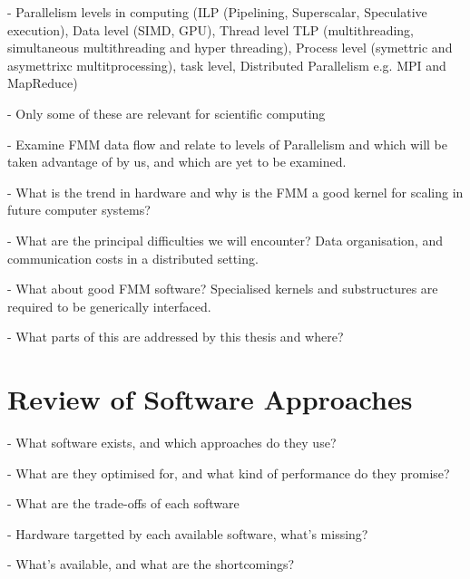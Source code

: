 - Parallelism levels in computing (ILP (Pipelining, Superscalar, Speculative execution), Data level (SIMD, GPU), Thread level TLP (multithreading, simultaneous multithreading and hyper threading), Process level (symettric and asymettrixc multitprocessing), task level, Distributed Parallelism e.g. MPI and MapReduce)

- Only some of these are relevant for scientific computing

- Examine FMM data flow and relate to levels of Parallelism and which will be taken advantage of by us, and which are yet to be examined.

- What is the trend in hardware and why is the FMM a good kernel for scaling in future computer systems?

- What are the principal difficulties we will encounter? Data organisation, and communication costs in a distributed setting.

- What about good FMM software? Specialised kernels and substructures are required to be generically interfaced.

- What parts of this are addressed by this thesis and where?


\section{Review of Software Approaches}

- What software exists, and which approaches do they use?

- What are they optimised for, and what kind of performance do they promise?

- What are the trade-offs of each software

- Hardware targetted by each available software, what's missing?

- What's available, and what are the shortcomings?


